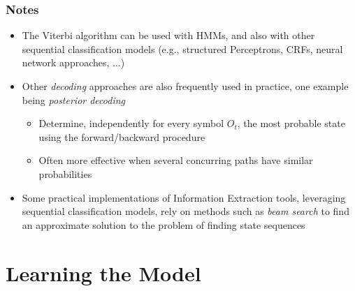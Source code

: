 \documentclass{beamer}
\begin{document}
\begin{frame} \frametitle{Notes}
  \begin{itemize}
  \item The Viterbi algorithm can be used with HMMs, and also with other sequential classification models (e.g., structured Perceptrons, CRFs, neural network approaches, $\ldots$)
  
  \item Other {\it decoding} approaches are also frequently used in practice, one example being \emph{posterior decoding} 
  \begin{itemize}
  \item Determine, independently for every symbol $O_t$, the most probable state using the forward/backward procedure
  \item Often more effective when several concurring paths have similar probabilities
  \end{itemize}

  \item Some practical implementations of Information Extraction tools, leveraging sequential classification models, rely on methods such as \emph{beam search} to find an approximate solution to the problem of finding state sequences %

  \end{itemize}
\end{frame}


\section{Learning the Model}
\end{document}
